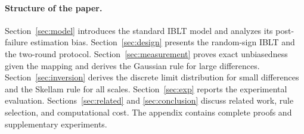 \paragraph{Structure of the paper.}
Section~\ref{sec:model} introduces the standard IBLT model and analyzes its post-failure estimation bias. Section~\ref{sec:design} presents the random-sign IBLT and the two-round protocol. Section~\ref{sec:measurement} proves exact unbiasedness given the mapping and derives the Gaussian rule for large differences. Section~\ref{sec:inversion} derives the discrete limit distribution for small differences and the Skellam rule for all scales. Section~\ref{sec:exp} reports the experimental evaluation. Sections~\ref{sec:related} and \ref{sec:conclusion} discuss related work, rule selection, and computational cost. The appendix contains complete proofs and supplementary experiments.
